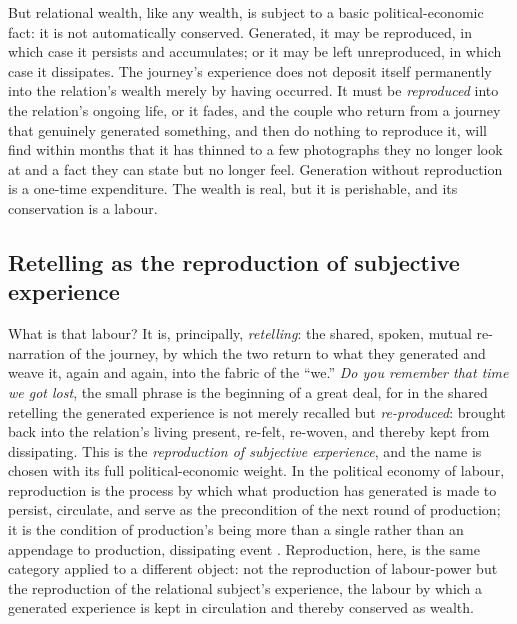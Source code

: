 But relational wealth, like any wealth, is subject to a basic political-economic fact: it is not automatically conserved. Generated, it may be reproduced, in which case it persists and accumulates; or it may be left unreproduced, in which case it dissipates. The journey's experience does not deposit itself permanently into the relation's wealth merely by having occurred. It must be \emph{reproduced} into the relation's ongoing life, or it fades, and the couple who return from a journey that genuinely generated something, and then do nothing to reproduce it, will find within months that it has thinned to a few photographs they no longer look at and a fact they can state but no longer feel. Generation without reproduction is a one-time expenditure. The wealth is real, but it is perishable, and its conservation is a labour.

\subsection{Retelling as the reproduction of subjective experience}
\label{p21:sub:reproduction-retelling}

What is that labour? It is, principally, \emph{retelling}: the shared, spoken, mutual re-narration of the journey, by which the two return to what they generated and weave it, again and again, into the fabric of the ``we.'' \emph{Do you remember that time we got lost}, the small phrase is the beginning of a great deal, for in the shared retelling the generated experience is not merely recalled but \emph{re-produced}: brought back into the relation's living present, re-felt, re-woven, and thereby kept from dissipating. This is the \emph{reproduction of subjective experience}, and the name is chosen with its full political-economic weight. In the political economy of labour, reproduction is the process by which what production has generated is made to persist, circulate, and serve as the precondition of the next round of production; it is the condition of production's being more than a single rather than an appendage to production, dissipating event \parencite{federici2004}. Reproduction, here, is the same category applied to a different object: not the reproduction of labour-power but the reproduction of the relational subject's experience, the labour by which a generated experience is kept in circulation and thereby conserved as wealth.

